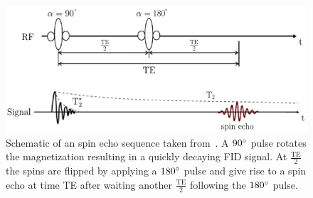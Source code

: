 \begin{figure}[h] %
	\centering
	\includegraphics[width=\linewidth]{./Images/SpinEcho.pdf} 
	\caption{Schematic of an spin echo sequence taken from~\cite{PulseSequences}. A $90 \degree$ pulse rotates the magnetization resulting in a quickly decaying FID signal. At $\frac{\text{TE}}{2}$ the spins are flipped by applying a $180 \degree$ pulse and give rise to a spin echo at time TE after waiting another $\frac{\text{TE}}{2}$ following the $180 \degree$ pulse.}
	\label{fig:SpinEcho}
\end{figure}


